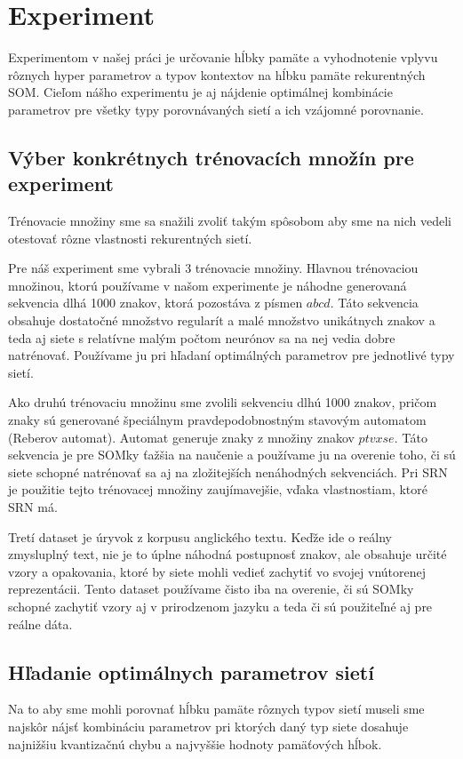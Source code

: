 \chapter{Experiment}

Experimentom v našej práci je určovanie hĺbky pamäte a vyhodnotenie vplyvu rôznych
hyper parametrov a typov kontextov na hĺbku pamäte rekurentných SOM.
Cieľom nášho experimentu je aj nájdenie 
optimálnej kombinácie parametrov pre všetky typy porovnávaných sietí a ich vzájomné porovnanie.

\section{Výber konkrétnych trénovacích množín pre experiment}
Trénovacie množiny sme sa snažili zvoliť
takým spôsobom aby sme na nich vedeli otestovať rôzne vlastnosti rekurentných sietí.

Pre náš experiment sme vybrali 3 trénovacie množiny.
Hlavnou trénovaciou množinou, ktorú používame v našom experimente je náhodne generovaná 
sekvencia dlhá 1000 znakov, ktorá pozostáva z písmen $abcd$.
Táto sekvencia obsahuje dostatočné množstvo regularít a malé množstvo unikátnych znakov a teda
aj siete s relatívne malým počtom neurónov sa na nej vedia dobre natrénovať.
Používame ju pri hľadaní optimálných parametrov pre jednotlivé typy sietí.

Ako druhú trénovaciu množinu sme zvolili sekvenciu dlhú 1000 znakov, pričom znaky sú generované
špeciálnym pravdepodobnostným stavovým automatom (Reberov automat). Automat generuje znaky z množiny znakov $ptvxse$.
Táto sekvencia je pre SOMky ťažšia na naučenie a používame ju na overenie toho, či sú siete schopné natrénovať sa aj
na zložitejších nenáhodných sekvenciách. Pri SRN je použitie tejto trénovacej množiny zaujímavejšie,
vďaka vlastnostiam, ktoré SRN má.

Tretí dataset je úryvok z korpusu anglického textu.
Keďže ide o reálny zmysluplný text, nie je to úplne náhodná postupnosť znakov, ale obsahuje určité vzory a opakovania, ktoré by siete mohli vedieť zachytiť
vo svojej vnútorenej reprezentácii.
Tento dataset používame čisto iba na overenie, či 
sú SOMky schopné zachytiť vzory aj v prirodzenom jazyku a teda či sú použiteľné aj pre 
reálne dáta.

\section{Hľadanie optimálnych parametrov sietí}
Na to aby sme mohli porovnať hĺbku pamäte rôznych typov sietí museli sme najskôr
nájsť kombináciu parametrov pri ktorých daný typ siete dosahuje najnižšiu kvantizačnú chybu a 
najvyššie hodnoty pamäťových hĺbok. 

